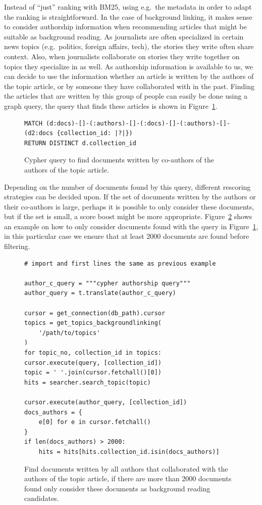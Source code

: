 \noindent Instead of ``just'' ranking with BM25, using e.g.\ the metadata in order to adapt the ranking is straightforward. In the case of background linking, it makes sense to consider authorship information when recommending articles that might be suitable as background reading. As journalists are often specialized in certain news topics (e.g.\ politics, foreign affairs, tech), the stories they write often share context. Also, when journalists collaborate on stories they write together on topics they specialize in as well. As authorship information is available to us, we can decide to use the information whether an article is written by the authors of the topic article, or by someone they have collaborated with in the past. Finding the articles that are written by this group of people can easily be done using a graph query, the query that finds these articles is shown in Figure~\ref{fig:author-cypher}.

\begin{figure}
	\begin{verbatim}
MATCH (d:docs)-[]-(:authors)-[]-(:docs)-[]-(:authors)-[]-(d2:docs {collection_id: |?|}) 
RETURN DISTINCT d.collection_id
	\end{verbatim}
	\caption{Cypher query to find documents written by co-authors of the authors of the topic article.}
	\label{fig:author-cypher}
\end{figure}

\noindent Depending on the number of documents found by this query, different rescoring strategies can be decided upon. If the set of documents written by the authors or their co-authors is large, perhaps it is possible to only consider these documents, but if the set is small, a score boost might be more appropriate. Figure~\ref{fig:authors-code} shows an example on how to only consider documents found with the query in Figure~\ref{fig:author-cypher}, in this particular case we ensure that at least 2000 documents are found before filtering.

\begin{figure}
	\begin{verbatim}
# import and first lines the same as previous example

author_c_query = """cypher authorship query"""
author_query = t.translate(author_c_query)

cursor = get_connection(db_path).cursor
topics = get_topics_backgroundlinking(
	'/path/to/topics'
)
for topic_no, collection_id in topics:
cursor.execute(query, [collection_id])
topic = ' '.join(cursor.fetchall()[0])
hits = searcher.search_topic(topic)

cursor.execute(author_query, [collection_id])
docs_authors = {
	e[0] for e in cursor.fetchall()
}
if len(docs_authors) > 2000:
	hits = hits[hits.collection_id.isin(docs_authors)]
	\end{verbatim}
	\caption{Find documents written by all authors that collaborated with the authors of the topic article, if there are more than 2000 documents found only consider these documents as background reading candidates.}
	\label{fig:authors-code}
\end{figure}

